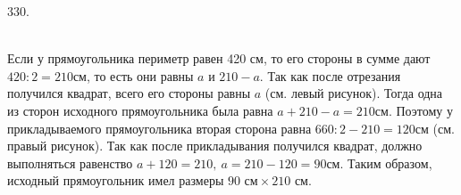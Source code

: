 330.\begin{figure}[ht!]
\end{figure}\\
Если у прямоугольника периметр равен 420 см, то его стороны в сумме дают $420:2=210$см, то есть они равны $a$ и $210-a.$ Так как после отрезания получился квадрат, всего его стороны равны $a$ (см. левый рисунок). Тогда одна из сторон исходного прямоугольника была равна $a+210-a=210$см. Поэтому у прикладываемого прямоугольника вторая сторона равна $660:2-210=120$см (см. правый рисунок). Так как после прикладывания получился квадрат, должно выполняться равенство $a+120=210,\ a=210-120=90$см. Таким образом, исходный прямоугольник имел размеры $90\text{ см}\times210\text{ см}.$\\
